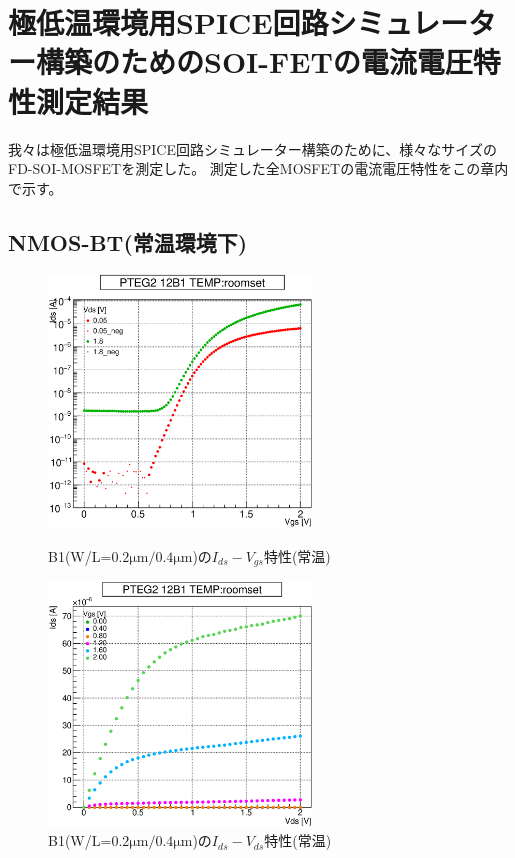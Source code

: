 \appendix
\chapter{極低温環境用SPICE回路シミュレーター構築のためのSOI-FETの電流電圧特性測定結果}
	我々は極低温環境用SPICE回路シミュレーター構築のために、様々なサイズのFD-SOI-MOSFETを測定した。
	測定した全MOSFETの電流電圧特性をこの章内で示す。
		\section{NMOS-BT(常温環境下)}
				\begin{figure}[htbp]
					\begin{minipage}{0.5\hsize}
						\begin{center}
							\includegraphics[width=70mm]{./Chapter/Appendix/Picture/NBT/B1/PTEG2_12_B1_IdVg_roomset.eps}
						\end{center}
						\caption{B1(W/L=$0.2\mathrm{\mu m}/0.4\mathrm{\mu m}$)の$I_{ds}-V_{gs}$特性(常温)}
						\label{fig:B1_IdVg_room}
					\end{minipage}
					\begin{minipage}{0.5\hsize}
						\begin{center}
							\includegraphics[width=70mm]{./Chapter/Appendix/Picture/NBT/B1/PTEG2_12_B1_IdVd_roomset.eps}
						\end{center}
						\caption{B1(W/L=$0.2\mathrm{\mu m}/0.4\mathrm{\mu m}$)の$I_{ds}-V_{ds}$特性(常温)}
						\label{fig:B1_IdVd_room}
					\end{minipage}
				\end{figure}
